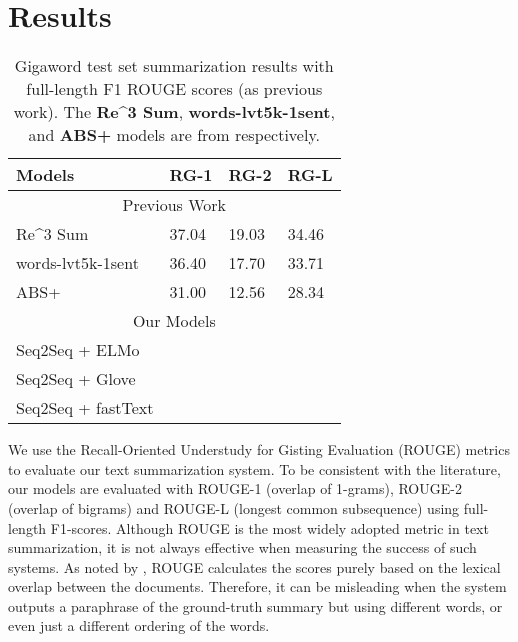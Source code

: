 \section{Results}
\label{sec: result}

\begin{table}[ht]
\centering
\caption{Gigaword test set summarization results with full-length F1 ROUGE scores (as previous work). The \textbf{Re\^{}3 Sum}, \textbf{words-lvt5k-1sent}, and \textbf{ABS+} models are from \cite{cao2018retrieve, nallapati2016abstractive, rush2015neural} respectively.}
\begin{tabular}{|l|l|l|l|} 
\hline
Models                                        & \multicolumn{1}{c|}{RG-1} & \multicolumn{1}{c|}{RG-2} & \multicolumn{1}{c|}{RG-L}  \\ 
\hline
\multicolumn{4}{|c|}{Previous Work}                                                                                                         \\ 
\hline
Re\^{}3 Sum         & 37.04                        & 19.03                        & 34.46                         \\ 
\hline
words-lvt5k-1sent & 36.40                        & 17.70                        & 33.71                         \\ 
\hline
ABS+               & 31.00                        & 12.56                        & 28.34                         \\ 
\hline
\multicolumn{4}{|c|}{Our Models}                                                                                                            \\ 
\hline
Seq2Seq + ELMo                                &                              &                              &                               \\ 
\hline
Seq2Seq + Glove                               &                              &                              &                               \\ 
\hline
Seq2Seq + fastText                            &                              &                              &                               \\
\hline
\end{tabular}
\end{table}


We use the Recall-Oriented Understudy for Gisting Evaluation (ROUGE) metrics \cite{lin2004rouge} to evaluate our text summarization system. To be consistent with the literature, our models are evaluated with ROUGE-1 (overlap of 1-grams), ROUGE-2 (overlap of bigrams) and ROUGE-L (longest common subsequence) using full-length F1-scores. Although ROUGE is the most widely adopted metric in text summarization, it is not always effective when measuring the success of such systems. As noted by \cite{cohan2016revisiting}, ROUGE calculates the scores purely based on the lexical overlap between the documents. Therefore, it can be misleading when the system outputs a paraphrase of the ground-truth summary but using different words, or even just a different ordering of the words.


